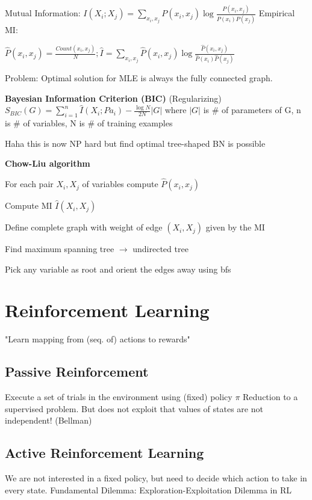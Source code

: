 \documentclass[a4paper, 11pt]{scrartcl}
\begin{document}
\begin{multicols*}{3}
Mutual Information: $I(X_i; X_j) = \sum_{x_i, x_j} P(x_i, x_j) \log \frac{P(x_i, x_j)}{P(x_i) P(x_j)}$
Empirical MI: 

$\hat{P}(x_i, x_j) = \frac{Count(x_i, x_j)}{N}; \hat{I} = \sum_{x_i, x_j} \hat{P}(x_i, x_j) \log \frac{\hat{P}(x_i, x_j)}{\hat{P}(x_i) \hat{P}(x_j)}$

Problem: Optimal solution for MLE is always the fully  connected graph. 

\textbf{Bayesian Information Criterion (BIC)}
(Regularizing) $S_{BIC}(G) = \sum_{i=1}^{n} \hat{I}(X_i ; Pa_i) - \frac{\log N}{2N} |G|$ where $|G|$ is \# of parameters of G, n is \# of variables, N is \# of training examples

Haha this is now NP hard but find optimal tree-shaped BN is possible

\textbf{Chow-Liu algorithm}
\begin{compactitem}
	\item For each pair $X_i, X_j$ of variables compute $\hat{P}(x_i, x_j)$
	\item Compute MI $\hat{I}(X_i, X_j)$
	\item Define complete graph with weight of edge $(X_i,X_j)$ given by the MI
	\item Find maximum spanning tree $\rightarrow$ undirected tree
	\item Pick any variable as root and orient the edges away using bfs

\end{compactitem}


\section{Reinforcement Learning}
"Learn mapping from (seq. of) actions to rewards"

\subsection{Passive Reinforcement}
Execute a set of trials in the environment using (fixed) policy  $\pi$
Reduction to a supervised problem. But does not exploit that values of states are not independent! (Bellman)

\subsection{Active Reinforcement Learning}
We are not interested in a fixed policy, but need to decide which action to take in every state. Fundamental Dilemma: Exploration-Exploitation Dilemma in RL


\end{multicols*}
\end{document}
